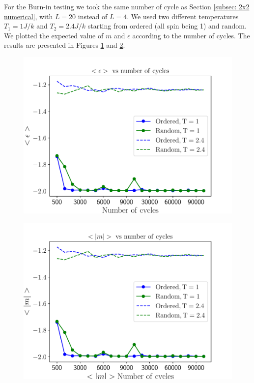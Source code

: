 \documentclass[english,notitlepage,reprint,nofootinbib]{revtex4-2}  %
\begin{document}
	For the Burn-in testing we took the same number of cycle as Section \ref{subsec: 2x2 numerical},
	with $L=20$ instead of $L=4$. We used two different temperatures $T_1=1 J/k$ and $T_2=2.4 J/k$
	starting from ordered (all spin being 1) and random. We plotted the expected value of $m$ 
	and $\epsilon$ according to the number of cycles. The results are presented in 
	Figures \ref{fig:eps5} and \ref{fig:m5}. 
	
	\begin{figure}[h!]
		\centering
		\includegraphics[scale=0.55]{figures/epsilon_problem5.pdf}
		\caption{}
		\label{fig:eps5}
	\end{figure}
	\begin{figure}[h!]
		\centering
		\includegraphics[scale=0.55]{figures/m_problem5}
		\caption{}
		\label{fig:m5}
	\end{figure}
\end{document}
